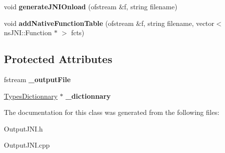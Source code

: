 \begin{DoxyCompactItemize}
\item 
\hypertarget{classnsJNI_1_1OutputJNI_aebf83bb01e0275abcc5d576a9f377b5f}{void {\bfseries generate\-J\-N\-I\-Onload} (ofstream \&f, string filename)}\label{classnsJNI_1_1OutputJNI_aebf83bb01e0275abcc5d576a9f377b5f}

\item 
\hypertarget{classnsJNI_1_1OutputJNI_a954d6e20e6c971ba999ae3c362d8fc9a}{void {\bfseries add\-Native\-Function\-Table} (ofstream \&f, string filename, vector$<$ ns\-J\-N\-I\-::\-Function $\ast$ $>$ fcts)}\label{classnsJNI_1_1OutputJNI_a954d6e20e6c971ba999ae3c362d8fc9a}

\end{DoxyCompactItemize}
\subsection*{\-Protected \-Attributes}
\begin{DoxyCompactItemize}
\item 
\hypertarget{classnsJNI_1_1OutputJNI_aa2742252ab4403918914dfbd2915fbf2}{fstream {\bfseries \-\_\-output\-File}}\label{classnsJNI_1_1OutputJNI_aa2742252ab4403918914dfbd2915fbf2}

\item 
\hypertarget{classnsJNI_1_1OutputJNI_af3a75f4e7723e0255d3d6177035e60db}{\hyperlink{classnsJNI_1_1TypesDictionnary}{\-Types\-Dictionnary} $\ast$ {\bfseries \-\_\-dictionnary}}\label{classnsJNI_1_1OutputJNI_af3a75f4e7723e0255d3d6177035e60db}

\end{DoxyCompactItemize}


\-The documentation for this class was generated from the following files\-:\begin{DoxyCompactItemize}
\item 
\-Output\-J\-N\-I.\-h\item 
\-Output\-J\-N\-I.\-cpp\end{DoxyCompactItemize}
